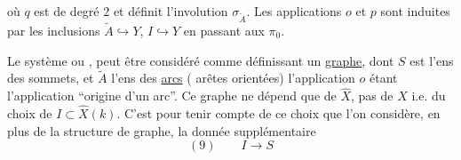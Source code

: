 où $q$ est de degré $2$ et définit l'involution $\sigma_{\widetilde A}$. Les applications $o$ et $p$ sont induites par les inclusions $\widetilde A\hookrightarrow Y$, $I\hookrightarrow Y$ en passant aux $\pi_0$.

Le système
ou
, peut être considéré comme définissant un \uline{graphe}, dont $S$ est l'ens des sommets, et $\widetilde A$ l'ens des \uline{arcs} ( arêtes orientées) l'application $o$ étant l'application ``origine d'un arc''. Ce graphe ne dépend que de $\widehat X$, pas de $X$ i.e. du choix de $I\subset\widehat X(k)$. C'est pour tenir compte de ce choix que l'on considère, en plus de la structure de graphe, la donnée supplémentaire
\[
(9)\qquad I\longrightarrow S
\]
